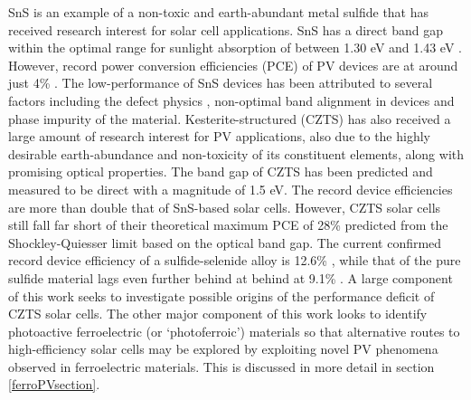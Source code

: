 \documentclass[11pt, twoside]{report}
\begin{document}
SnS is an example of a non-toxic and earth-abundant metal sulfide that has received research interest for solar cell applications. SnS has a direct band gap within the optimal range for sunlight absorption of between 1.30 eV \cite{Lee_thesis_59} and 1.43 eV \cite{Lee_thesis_60}. However, record power conversion efficiencies (PCE) of PV devices are at around just 4\% \cite{SnS_record}. The low-performance of SnS devices has been attributed to several factors including the defect physics \cite{Lee_SnS_defects}, non-optimal band alignment in devices \cite{Lee_SnS_band} and phase impurity \cite{Lee_SnS_phases} of the material.
Kesterite-structured {\CZTS} (CZTS) has also received a large amount of research interest for PV applications, also due to the highly desirable earth-abundance and non-toxicity of its constituent elements, along with promising optical properties. The band gap of CZTS has been predicted \cite{CZTS_bandgap_theory} and measured \cite{CZTS_bandgap_exp} to be direct with a magnitude of 1.5 eV. 
The record device efficiencies are more than double that of SnS-based solar cells. However, CZTS solar cells still fall far short of their theoretical maximum PCE of 28\% predicted from the Shockley-Quiesser limit based on the optical band gap. The current confirmed record device efficiency of a sulfide-selenide alloy is 12.6\% \cite{Mitzi2017_rev_21}, while that of the pure sulfide material lags even further behind at behind at 9.1\% \cite{CZTS_record}. A large component of this work seeks to investigate possible origins of the performance deficit of CZTS solar cells. The other major component of this work looks to identify photoactive ferroelectric (or `photoferroic') materials so that alternative routes to high-efficiency solar cells may be explored by exploiting novel PV phenomena observed in ferroelectric materials. This is discussed in more detail in section \ref{ferroPVsection}. 
\end{document}
